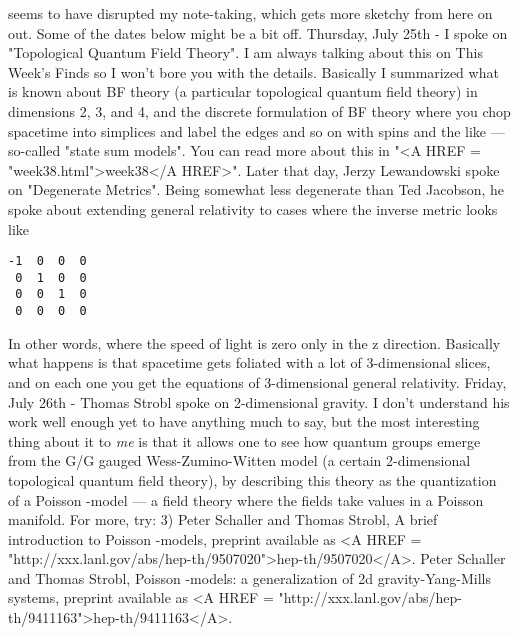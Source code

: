 seems to have disrupted my note-taking, which gets more sketchy
from here on out.  Some of the dates below might be a bit off.
Thursday, July 25th - I spoke on "Topological Quantum Field
Theory".  I am always talking about this on This Week's Finds so
I won't bore you with the details.  Basically I summarized what
is known about BF theory (a particular topological quantum field
theory) in dimensions 2, 3, and 4, and the discrete formulation
of BF theory where you chop spacetime into simplices and label
the edges and so on with spins and the like --- so-called "state
sum models".  You can read more about this in 
"<A HREF = "week38.html">week38</A HREF>".
Later that day, Jerzy Lewandowski spoke on "Degenerate Metrics".
Being somewhat less degenerate than Ted Jacobson, he spoke about
extending general relativity to cases where the inverse metric
looks like
\begin{verbatim}
-1  0  0  0
 0  1  0  0
 0  0  1  0 
 0  0  0  0
\end{verbatim}
    
In other words, where the speed of light is zero only in the z
direction.  Basically what happens is that spacetime gets
foliated with a lot of 3-dimensional slices, and on each one you
get the equations of 3-dimensional general relativity.
Friday, July 26th - Thomas Strobl spoke on 2-dimensional
gravity. I don't understand his work well enough yet to have
anything much to say, but the most interesting thing about it to
\emph{me} is that it allows one to see how quantum groups emerge from
the G/G gauged Wess-Zumino-Witten model (a certain 2-dimensional
topological quantum field theory), by describing this theory as
the quantization of a Poisson \sigma -model --- a field theory
where the fields take values in a Poisson manifold.  For more,
try:
3) Peter Schaller and Thomas Strobl, A brief introduction to
Poisson \sigma -models, preprint available as 
<A HREF = "http://xxx.lanl.gov/abs/hep-th/9507020">hep-th/9507020</A>.
Peter Schaller and Thomas Strobl, Poisson \sigma -models: a
generalization of 2d gravity-Yang-Mills systems, preprint
available as <A HREF =
"http://xxx.lanl.gov/abs/hep-th/9411163">hep-th/9411163</A>.

